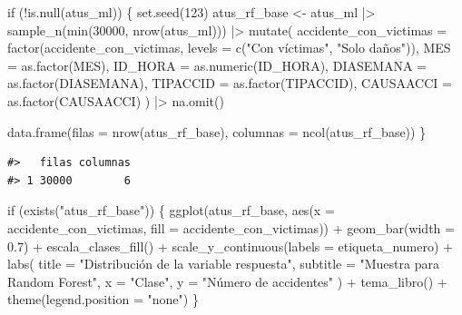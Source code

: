 \documentclass[
  spanish,
  10.5pt,
  letterpaper,
  openany,
  headings=big]{scrbook}
\newenvironment{Shaded}{}{}
\newcommand{\AttributeTok}[1]{\textcolor[rgb]{0.84,0.23,0.29}{#1}}
\newcommand{\ControlFlowTok}[1]{\textcolor[rgb]{0.84,0.23,0.29}{#1}}
\newcommand{\DecValTok}[1]{\textcolor[rgb]{0.00,0.36,0.77}{#1}}
\newcommand{\FloatTok}[1]{\textcolor[rgb]{0.00,0.36,0.77}{#1}}
\newcommand{\FunctionTok}[1]{\textcolor[rgb]{0.44,0.26,0.76}{#1}}
\newcommand{\NormalTok}[1]{\textcolor[rgb]{0.14,0.16,0.18}{#1}}
\newcommand{\OtherTok}[1]{\textcolor[rgb]{0.44,0.26,0.76}{#1}}
\newcommand{\SpecialCharTok}[1]{\textcolor[rgb]{0.00,0.36,0.77}{#1}}
\newcommand{\StringTok}[1]{\textcolor[rgb]{0.01,0.18,0.38}{#1}}
\newcounter{none} %
\begin{document}
\begin{Shaded}
\begin{Highlighting}[]
\ControlFlowTok{if}\NormalTok{ (}\SpecialCharTok{!}\FunctionTok{is.null}\NormalTok{(atus\_ml)) \{}
  \FunctionTok{set.seed}\NormalTok{(}\DecValTok{123}\NormalTok{)}
\NormalTok{  atus\_rf\_base }\OtherTok{\textless{}{-}}\NormalTok{ atus\_ml }\SpecialCharTok{|\textgreater{}}
    \FunctionTok{sample\_n}\NormalTok{(}\FunctionTok{min}\NormalTok{(}\DecValTok{30000}\NormalTok{, }\FunctionTok{nrow}\NormalTok{(atus\_ml))) }\SpecialCharTok{|\textgreater{}}
    \FunctionTok{mutate}\NormalTok{(}
      \AttributeTok{accidente\_con\_victimas =} \FunctionTok{factor}\NormalTok{(accidente\_con\_victimas, }\AttributeTok{levels =} \FunctionTok{c}\NormalTok{(}\StringTok{"Con víctimas"}\NormalTok{, }\StringTok{"Solo daños"}\NormalTok{)),}
      \AttributeTok{MES =} \FunctionTok{as.factor}\NormalTok{(MES),}
      \AttributeTok{ID\_HORA =} \FunctionTok{as.numeric}\NormalTok{(ID\_HORA),}
      \AttributeTok{DIASEMANA =} \FunctionTok{as.factor}\NormalTok{(DIASEMANA),}
      \AttributeTok{TIPACCID =} \FunctionTok{as.factor}\NormalTok{(TIPACCID),}
      \AttributeTok{CAUSAACCI =} \FunctionTok{as.factor}\NormalTok{(CAUSAACCI)}
\NormalTok{    ) }\SpecialCharTok{|\textgreater{}}
    \FunctionTok{na.omit}\NormalTok{()}

  \FunctionTok{data.frame}\NormalTok{(}\AttributeTok{filas =} \FunctionTok{nrow}\NormalTok{(atus\_rf\_base), }\AttributeTok{columnas =} \FunctionTok{ncol}\NormalTok{(atus\_rf\_base))}
\NormalTok{\}}
\end{Highlighting}
\end{Shaded}

\begin{verbatim}
#>   filas columnas
#> 1 30000        6
\end{verbatim}

\begin{Shaded}
\begin{Highlighting}[]
\ControlFlowTok{if}\NormalTok{ (}\FunctionTok{exists}\NormalTok{(}\StringTok{"atus\_rf\_base"}\NormalTok{)) \{}
  \FunctionTok{ggplot}\NormalTok{(atus\_rf\_base, }\FunctionTok{aes}\NormalTok{(}\AttributeTok{x =}\NormalTok{ accidente\_con\_victimas, }\AttributeTok{fill =}\NormalTok{ accidente\_con\_victimas)) }\SpecialCharTok{+}
    \FunctionTok{geom\_bar}\NormalTok{(}\AttributeTok{width =} \FloatTok{0.7}\NormalTok{) }\SpecialCharTok{+}
    \FunctionTok{escala\_clases\_fill}\NormalTok{() }\SpecialCharTok{+}
    \FunctionTok{scale\_y\_continuous}\NormalTok{(}\AttributeTok{labels =}\NormalTok{ etiqueta\_numero) }\SpecialCharTok{+}
    \FunctionTok{labs}\NormalTok{(}
      \AttributeTok{title =} \StringTok{"Distribución de la variable respuesta"}\NormalTok{,}
      \AttributeTok{subtitle =} \StringTok{"Muestra para Random Forest"}\NormalTok{,}
      \AttributeTok{x =} \StringTok{"Clase"}\NormalTok{,}
      \AttributeTok{y =} \StringTok{"Número de accidentes"}
\NormalTok{    ) }\SpecialCharTok{+}
    \FunctionTok{tema\_libro}\NormalTok{() }\SpecialCharTok{+}
    \FunctionTok{theme}\NormalTok{(}\AttributeTok{legend.position =} \StringTok{"none"}\NormalTok{)}
\NormalTok{\}}
\end{Highlighting}
\end{Shaded}
\end{document}
